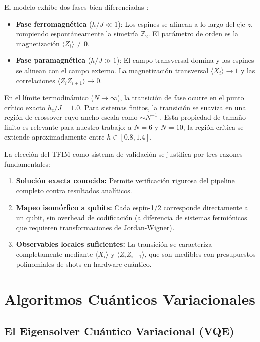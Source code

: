\documentclass[11pt,a4paper,spanish]{book}
\begin{document}
El modelo exhibe dos fases bien diferenciadas \citep{dutta2015}:

\begin{itemize}
    \item \textbf{Fase ferromagnética} ($h/J \ll 1$): Los espines se alinean a lo largo del eje $z$, rompiendo espontáneamente la simetría $\mathbb{Z}_2$. El parámetro de orden es la magnetización $\langle Z_i \rangle \neq 0$.
    \item \textbf{Fase paramagnética} ($h/J \gg 1$): El campo transversal domina y los espines se alinean con el campo externo. La magnetización transversal $\langle X_i \rangle \to 1$ y las correlaciones $\langle Z_i Z_{i+1} \rangle \to 0$.
\end{itemize}

En el límite termodinámico ($N \to \infty$), la transición de fase ocurre en el punto crítico exacto $h_c/J = 1.0$. Para sistemas finitos, la transición se suaviza en una región de crossover cuyo ancho escala como $\sim N^{-1}$ \citep{dutta2015}. Esta propiedad de tamaño finito es relevante para nuestro trabajo: a $N = 6$ y $N = 10$, la región crítica se extiende aproximadamente entre $h \in [0.8, 1.4]$.

La elección del TFIM como sistema de validación se justifica por tres razones fundamentales:

\begin{enumerate}
    \item \textbf{Solución exacta conocida:} Permite verificación rigurosa del pipeline completo contra resultados analíticos.
    \item \textbf{Mapeo isomórfico a qubits:} Cada espín-1/2 corresponde directamente a un qubit, sin overhead de codificación (a diferencia de sistemas fermiónicos que requieren transformaciones de Jordan-Wigner).
    \item \textbf{Observables locales suficientes:} La transición se caracteriza completamente mediante $\langle X_i \rangle$ y $\langle Z_i Z_{i+1} \rangle$, que son medibles con presupuestos polinomiales de shots en hardware cuántico.
\end{enumerate}

\section{Algoritmos Cuánticos Variacionales}

\subsection{El Eigensolver Cuántico Variacional (VQE)}
\end{document}
